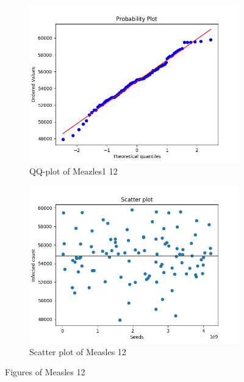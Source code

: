 \documentclass[a4paper]{article}
\begin{document}
\begin{figure}[H]
\begin{subfigure}{.5\textwidth}
  \centering
  \includegraphics[width=1\linewidth]
  {Measles_12/Measles_12-qqplot.png}
  \caption{QQ-plot of Meazles1 12}
  \label{fig:QQ-plot_Meazles_12}
\end{subfigure}%
\begin{subfigure}{.5\textwidth}
  \centering
  \includegraphics[width=1\linewidth]
  {Measles_12/Measles_12-scatterplot.png}
  \caption{Scatter plot of Measles 12}
  \label{fig:scatterplot_Meazles_12}
\end{subfigure}
\caption{Figures of Measles 12}
\label{fig:Meazles 12}
\end{figure}
\pagebreak
\end{document}
